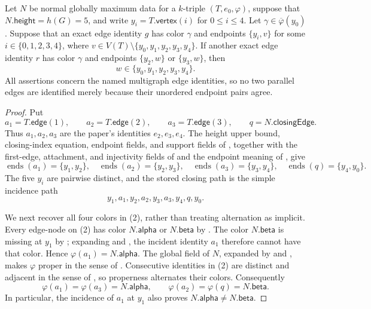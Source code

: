 \begin{helper}
Let $N$ be normal globally maximum data for a $k$-triple
$(T,e_0,\varphi)$, suppose that $N.\mathsf{height}=h(G)=5$, and write
$y_i=T.\mathsf{vertex}(i)$ for $0\leq i\leq4$.  Let
$\gamma\in\overline\varphi(y_0)$.  Suppose that an exact edge identity
$g$ has color $\gamma$ and endpoints $\{y_i,v\}$ for some
$i\in\{0,1,2,3,4\}$, where
$v\in V(T)\setminus\{y_0,y_1,y_2,y_3,y_4\}$.
If another exact edge identity $r$ has color $\gamma$ and endpoints
$\{y_2,w\}$ or $\{y_3,w\}$, then
\[
 w\in\{y_0,y_1,y_2,y_3,y_4\}.
\]
All assertions concern the named multigraph edge identities, so no two
parallel edges are identified merely because their unordered endpoint
pairs agree.
\end{helper}
\begin{proof}
Put
\[
 a_1=T.\mathsf{edge}(1),\qquad
 a_2=T.\mathsf{edge}(2),\qquad
 a_3=T.\mathsf{edge}(3),\qquad q=N.\mathsf{closingEdge}.
\]
Thus $a_1,a_2,a_3$ are the paper's identities $e_2,e_3,e_4$.
The height upper bound, closing-index equation, endpoint fields, and
support fields of , together with
the first-edge, attachment, and injectivity fields of
 and the endpoint meaning of
, give
\[
 \operatorname{ends}(a_1)=\{y_1,y_2\},\quad
 \operatorname{ends}(a_2)=\{y_2,y_3\},\quad
 \operatorname{ends}(a_3)=\{y_3,y_4\},\quad
 \operatorname{ends}(q)=\{y_4,y_0\}.                 \tag{1}
\]
The five $y_i$ are pairwise distinct, and the stored closing path is the
simple incidence path
\[
 y_1,a_1,y_2,a_2,y_3,a_3,y_4,q,y_0.                 \tag{2}
\]

We next recover all four colors in (2), rather than treating alternation
as implicit.  Every edge-node on (2) has color $N.\mathsf{alpha}$ or
$N.\mathsf{beta}$ by .  The color
$N.\mathsf{beta}$ is missing at $y_1$ by
; expanding
 and , the incident identity
$a_1$ therefore cannot have that color.  Hence
$\varphi(a_1)=N.\mathsf{alpha}$.  The global field of $N$, expanded by
 and , makes $\varphi$
proper in the sense of .  Consecutive
identities in (2) are distinct and adjacent in the sense of
, so properness alternates their colors.
Consequently
\[
 \varphi(a_1)=\varphi(a_3)=N.\mathsf{alpha},\qquad
 \varphi(a_2)=\varphi(q)=N.\mathsf{beta}.            \tag{3}
\]
In particular, the incidence of $a_1$ at $y_1$ also proves
$N.\mathsf{alpha}\ne N.\mathsf{beta}$.


\end{proof}
